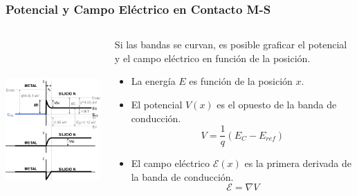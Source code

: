 \documentclass[10pt,t,aspectratio=169]{beamer}
\begin{document}
\begin{frame}[t]
    \frametitle{Potencial y Campo Eléctrico en Contacto M-S}

    \begin{columns}
    
        \begin{column}{0.5\textwidth}
        
            \centering
            \includegraphics[height=7cm]{./figures/contacto-MS-6.pdf}
            
        \end{column}
        
        \begin{column}{0.5\textwidth}
        
            Si las bandas se curvan, es posible graficar el potencial y el campo eléctrico en función de la posición.

            \begin{itemize}
                \item La energía $E$ es función de la posición $x$.
                \item El potencial $V(x)$ es el opuesto de la banda de conducción.
                \[ V = \dfrac{1}{q}(E_C - E_{ref}) \]
                \item El campo eléctrico $\mathcal{E}(x)$ es la primera derivada de la banda de conducción.
                \[ \mathcal{E} = \nabla{}V \]
            \end{itemize}
            
        \end{column}
        
    \end{columns}
    
\end{frame}
\end{document}
